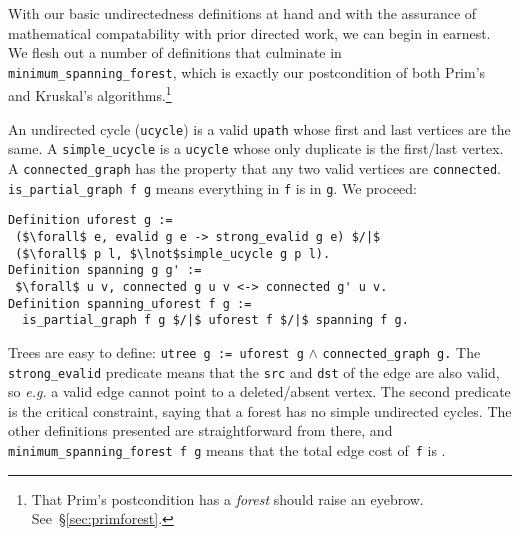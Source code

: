 With our basic undirectedness definitions at hand and with the assurance
of mathematical compatability with prior directed work, we can begin in
earnest. We flesh out a number of definitions that culminate in
\texttt{minimum\_spanning\_forest}, which is exactly our postcondition
of both Prim's and Kruskal's algorithms.\footnote{That Prim's postcondition has
a \emph{forest} should raise an eyebrow. See~\S\ref{sec:primforest}.}

An undirected cycle (\texttt{ucycle}) is a valid \texttt{upath} whose first
and last vertices are the same.  A \texttt{simple\_ucycle} is a \texttt{ucycle} whose
only duplicate is the first/last vertex. A \texttt{connected\_graph}
has the property that any two valid vertices are \texttt{connected}.
\texttt{is\_partial\_graph f g} means everything in \texttt{f} is in \texttt{g}.
We proceed:
\lstset{style=CoqStyle}
\begin{lstlisting}
Definition uforest g :=
 ($\forall$ e, evalid g e -> strong_evalid g e) $/|$
 ($\forall$ p l, $\lnot$simple_ucycle g p l).
Definition spanning g g' :=
 $\forall$ u v, connected g u v <-> connected g' u v.
Definition spanning_uforest f g :=
  is_partial_graph f g $/|$ uforest f $/|$ spanning f g.
\end{lstlisting}
Trees are easy to define:
\texttt{utree~g~:= uforest~g} $\wedge$ \texttt{connected\_graph~g.}
The \texttt{strong\_evalid} predicate means that the
\texttt{src} and \texttt{dst} of the edge are also valid, so
\emph{e.g.} a valid edge cannot point to a deleted/absent vertex.
The second predicate is the critical constraint, saying that a
forest has no simple undirected cycles. The other definitions presented
are straightforward from there, and
\texttt{minimum\_spanning\_forest f g} means that the total edge cost
of~\texttt{f} is .


